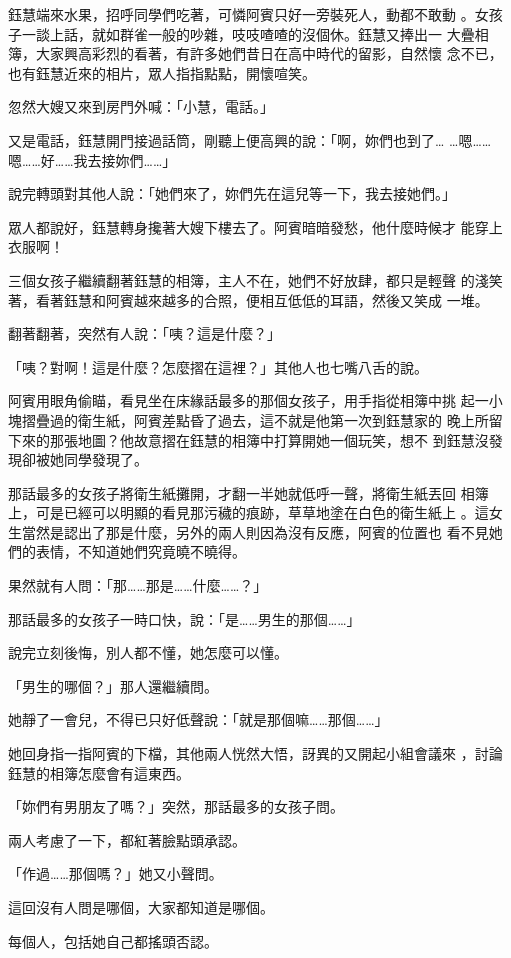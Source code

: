 鈺慧端來水果，招呼同學們吃著，可憐阿賓只好一旁裝死人，動都不敢動
。女孩子一談上話，就如群雀一般的吵雜，吱吱喳喳的沒個休。鈺慧又捧出一
大疊相簿，大家興高彩烈的看著，有許多她們昔日在高中時代的留影，自然懷
念不已，也有鈺慧近來的相片，眾人指指點點，開懷喧笑。

忽然大嫂又來到房門外喊：「小慧，電話。」

又是電話，鈺慧開門接過話筒，剛聽上便高興的說：「啊，妳們也到了…
…嗯……嗯……好……我去接妳們……」

說完轉頭對其他人說：「她們來了，妳們先在這兒等一下，我去接她們。」

眾人都說好，鈺慧轉身攙著大嫂下樓去了。阿賓暗暗發愁，他什麼時候才
能穿上衣服啊！

三個女孩子繼續翻著鈺慧的相簿，主人不在，她們不好放肆，都只是輕聲
的淺笑著，看著鈺慧和阿賓越來越多的合照，便相互低低的耳語，然後又笑成
一堆。

翻著翻著，突然有人說：「咦？這是什麼？」

「咦？對啊！這是什麼？怎麼摺在這裡？」其他人也七嘴八舌的說。

阿賓用眼角偷瞄，看見坐在床緣話最多的那個女孩子，用手指從相簿中挑
起一小塊摺疊過的衛生紙，阿賓差點昏了過去，這不就是他第一次到鈺慧家的
晚上所留下來的那張地圖？他故意摺在鈺慧的相簿中打算開她一個玩笑，想不
到鈺慧沒發現卻被她同學發現了。

那話最多的女孩子將衛生紙攤開，才翻一半她就低呼一聲，將衛生紙丟回
相簿上，可是已經可以明顯的看見那污穢的痕跡，草草地塗在白色的衛生紙上
。這女生當然是認出了那是什麼，另外的兩人則因為沒有反應，阿賓的位置也
看不見她們的表情，不知道她們究竟曉不曉得。

果然就有人問：「那……那是……什麼……？」

那話最多的女孩子一時口快，說：「是……男生的那個……」

說完立刻後悔，別人都不懂，她怎麼可以懂。

「男生的哪個？」那人還繼續問。

她靜了一會兒，不得已只好低聲說：「就是那個嘛……那個……」

她回身指一指阿賓的下檔，其他兩人恍然大悟，訝異的又開起小組會議來
，討論鈺慧的相簿怎麼會有這東西。

「妳們有男朋友了嗎？」突然，那話最多的女孩子問。

兩人考慮了一下，都紅著臉點頭承認。

「作過……那個嗎？」她又小聲問。

這回沒有人問是哪個，大家都知道是哪個。

每個人，包括她自己都搖頭否認。

